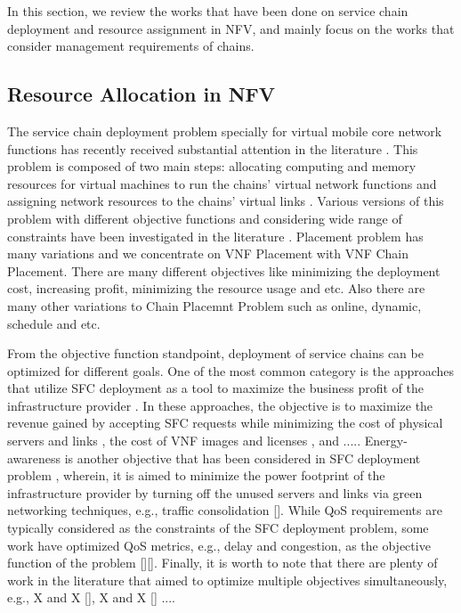 In this section, we review the works that have been done on service chain deployment and resource assignment in NFV, and mainly focus on the works that consider management requirements of chains.


\subsection{Resource Allocation in NFV}
The service chain deployment problem specially for virtual mobile core network functions has recently received substantial attention in the literature \cite{GilHerrera2016}\cite{Laghrissi2019}\cite{Bhamare2016}.
This problem is composed of two main steps: allocating computing and memory resources for virtual machines to run the chains' virtual network functions and assigning network resources to the chains' virtual links \cite{Laghrissi2019}. 
Various versions of this problem with different objective functions and considering wide range of constraints have been investigated in the literature \cite{Laghrissi2019}.
Placement problem has many variations and we concentrate on VNF Placement with VNF Chain Placement. There are many different objectives
like minimizing the deployment cost, increasing profit, minimizing the resource usage and etc. \cite{Laghrissi2019}\cite{Bhamare2016}
Also there are many other variations to Chain Placemnt Problem such as online, dynamic, schedule and etc. \cite{1608.00095}

From the objective function standpoint, deployment of service chains can be optimized for different goals. One of the most common category is the approaches that utilize SFC deployment as a tool to maximize the business profit of the infrastructure provider \cite{Eramo2016}\cite{Eramo2017}. In these approaches, the objective is to maximize the revenue gained by accepting SFC requests while minimizing the cost of physical servers and links \cite{Eramo2016}\cite{Eramo2017}, the cost of VNF images and licenses \cite{Bouet2015}, and ..... Energy-awareness is another objective that has been considered in SFC deployment problem \cite{Eramo20173}\cite{Farkiani2019}, wherein, it is aimed to minimize the power footprint of the infrastructure provider by turning off the unused servers and links via green networking techniques, e.g., traffic consolidation  []. While QoS requirements are typically considered as the constraints of the SFC deployment problem, some work have optimized QoS metrics, e.g., delay and congestion, as the objective function of the problem  [][]. Finally, it is worth to note that there are plenty of work in the literature that aimed to optimize multiple objectives simultaneously, e.g., X and X  [], X and X  [] .... 

